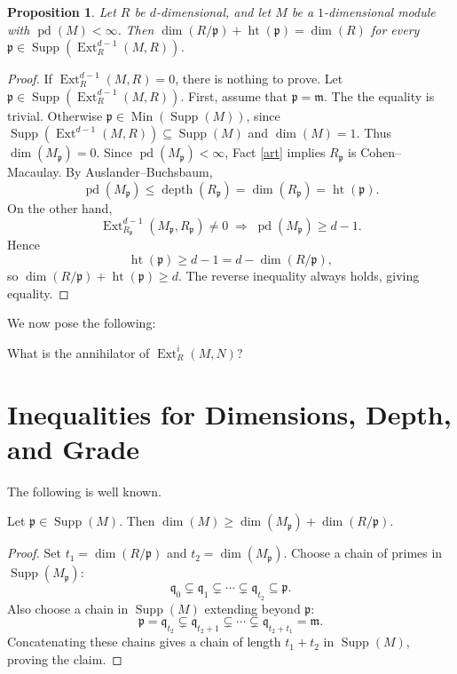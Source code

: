 \documentclass[11.05pt,a4paper]{amsart}
\newtheorem{proposition}[theorem]{Proposition}
\theoremstyle{definition}
\theoremstyle{remark}
\newcommand{\Min}{\operatorname{Min}}
\newcommand{\pd}{\operatorname{pd}}
\newcommand{\Ext}{\operatorname{Ext}}
\newcommand{\Supp}{\operatorname{Supp}}
\newcommand{\depth}{\operatorname{depth}}
\begin{document}
\begin{proposition}
	Let $R$ be $d$-dimensional, and let $M$ be a $1$-dimensional module with $\pd(M) < \infty$. Then 
	\(
	\dim(R/\mathfrak p) + \operatorname{ht}(\mathfrak p) = \dim(R) 
	\) for every $\mathfrak p \in \Supp(\Ext^{d-1}_R(M,R))$.
\end{proposition}

\begin{proof}
	If $\Ext^{d-1}_R(M,R)=0$, there is nothing to prove. Let $\mathfrak p \in \Supp(\Ext^{d-1}_R(M,R))$.
First, assume that $\mathfrak p = \mathfrak m$. The the equality is trivial. Otherwise $\mathfrak p \in \Min(\Supp(M))$, since $\Supp(\Ext^{d-1}(M,R)) \subseteq \Supp(M)$ and $\dim(M)=1$. Thus $\dim(M_{\mathfrak p})=0$.
	Since $\pd(M_{\mathfrak p})<\infty$, Fact \ref{art} implies $R_{\mathfrak p}$ is Cohen–Macaulay. By Auslander–Buchsbaum,
	\[
	\pd(M_{\mathfrak p}) \le \depth(R_{\mathfrak p}) = \dim(R_{\mathfrak p}) = \operatorname{ht}(\mathfrak p).
	\]
	On the other hand,
	\[
	\Ext^{d-1}_{R_{\mathfrak p}}(M_{\mathfrak p}, R_{\mathfrak p}) \neq 0
	\;\Rightarrow\;
	\pd(M_{\mathfrak p}) \ge d-1.
	\]
	Hence
	\[
	\operatorname{ht}(\mathfrak p) \ge d-1 = d - \dim(R/\mathfrak p),
	\]
	so
	\(
	\dim(R/\mathfrak p) + \operatorname{ht}(\mathfrak p) \ge d.
	\)
	The reverse inequality always holds, giving equality.
\end{proof}We now pose the following:
\begin{problem}
	What is the annihilator of $\Ext^i_R(M,N)$?
\end{problem}\medskip
\section{Inequalities for Dimensions, Depth, and Grade}

The following is well known.

\begin{fact}\label{71}
	Let $\mathfrak{p} \in \Supp(M)$. Then
	\(
	\dim(M) \ge \dim(M_{\mathfrak{p}}) + \dim(R/\mathfrak{p}).
	\)
\end{fact}

\begin{proof}
	Set $t_1 = \dim(R/\mathfrak{p})$ and $t_2 = \dim(M_{\mathfrak{p}})$. Choose a chain of primes in $\Supp(M_{\mathfrak{p}})$:
	\[
	\mathfrak{q}_0 \subsetneq \mathfrak{q}_1 \subsetneq \cdots \subsetneq \mathfrak{q}_{t_2} \subseteq \mathfrak{p}.
	\]
	Also choose a chain in $\Supp(M)$ extending beyond $\mathfrak{p}$:
	\[
	\mathfrak{p} = \mathfrak{q}_{t_2} \subsetneq \mathfrak{q}_{t_2+1} \subsetneq \cdots \subsetneq \mathfrak{q}_{t_2+t_1} = \mathfrak{m}.
	\]
	Concatenating these chains gives a chain of length $t_1+t_2$ in $\Supp(M)$, proving the claim.
\end{proof}
\end{document}
